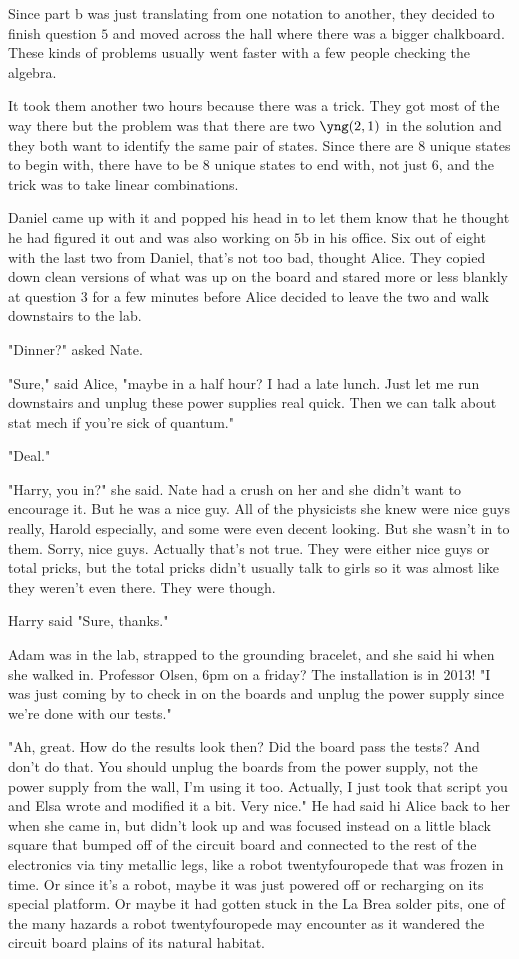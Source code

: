 Since part b was just translating from one notation to another, they decided to finish question $5$ and moved across the hall where there was a bigger chalkboard. These kinds of problems usually went faster with a few people checking the algebra. 

It took them another two hours because there was a trick. They got most of the way there but the problem was that there are two $\yng(2,1)$ in the solution and they both want to identify the same pair of states. Since there are 8 unique states to begin with, there have to be 8 unique states to end with, not just 6, and the trick was to take linear combinations.

Daniel came up with it and popped his head in to let them know that he thought he had figured it out and was also working on $5$b in his office. Six out of eight with the last two from Daniel, that's not too bad, thought Alice. They copied down clean versions of what was up on the board and stared more or less blankly at question 3 for a few minutes before Alice decided to leave the two and walk downstairs to the lab. 

"Dinner?" asked Nate. 

"Sure," said Alice, "maybe in a half hour? I had a late lunch. Just let me run downstairs and unplug these power supplies real quick. Then we can talk about stat mech if you're sick of quantum." 

"Deal." 

"Harry, you in?" she said. Nate had a crush on her and she didn't want to encourage it. But he was a nice guy. All of the physicists she knew were nice guys really, Harold especially, and some were even decent looking. But she wasn't in to them. Sorry, nice guys. Actually that's not true. They were either nice guys or total pricks, but the total pricks didn't usually talk to girls so it was almost like they weren't even there. They were though. 

Harry said "Sure, thanks." 

\mypause

Adam was in the lab, strapped to the grounding bracelet, and she said hi when she walked in. Professor Olsen, 6pm on a friday? The installation is in 2013! "I was just coming by to check in on the boards and unplug the power supply since we're done with our tests."

"Ah, great. How do the results look then? Did the board pass the tests? And don't do that. You should unplug the boards from the power supply, not the power supply from the wall, I'm using it too. Actually, I just took that script you and Elsa wrote and modified it a bit. Very nice." He had said hi Alice back to her when she came in, but didn't look up and was focused instead on a little black square that bumped off of the circuit board and connected to the rest of the electronics via tiny metallic legs, like a robot twentyfouropede that was frozen in time. Or since it's a robot, maybe it was just powered off or recharging on its special platform. Or maybe it had gotten stuck in the La Brea solder pits, one of the many hazards a robot twentyfouropede may encounter as it wandered the circuit board plains of its natural habitat. 

